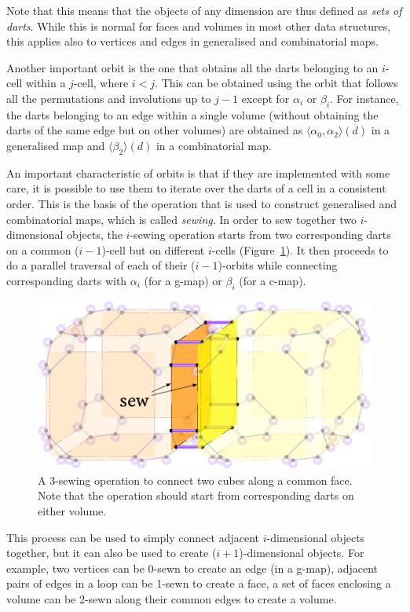 Note that this means that the objects of any dimension are thus defined as \emph{sets of darts}.
While this is normal for faces and volumes in most other data structures, this applies also to vertices and edges in generalised and combinatorial maps.

Another important orbit is the one that obtains all the darts belonging to an \(i\)-cell within a \(j\)-cell, where \(i < j\).
This can be obtained using the orbit that follows all the permutations and involutions up to \(j-1\) except for \(\alpha_i\) or \(\beta_i\).
For instance, the darts belonging to an edge within a single volume (without obtaining the darts of the same edge but on other volumes) are obtained as \(\langle \alpha_0, \alpha_2 \rangle(d)\) in a generalised map and \(\langle \beta_2 \rangle(d)\) in a combinatorial map.

An important characteristic of orbits is that if they are implemented with some care, it is possible to use them to iterate over the darts of a cell in a consistent order.
This is the basis of the operation that is used to construct generalised and combinatorial maps, which is called \emph{sewing}.
In order to sew together two \(i\)-dimensional objects, the \(i\)-sewing operation starts from two corresponding darts on a common (\(i-1\))-cell but on different \(i\)-cells (Figure~\ref{fig:3-sew}).
It then proceeds to do a parallel traversal of each of their (\(i-1\))-orbits while connecting corresponding darts with \(\alpha_i\) (for a g-map) or \(\beta_i\) (for a c-map).

\begin{figure}
\centering
\includegraphics[width=0.8\linewidth]{figs/3-sew}
\caption{A 3-sewing operation to connect two cubes along a common face.
Note that the operation should start from corresponding darts on either volume.}%
\label{fig:3-sew}
\end{figure}

This process can be used to simply connect adjacent \(i\)-dimensional objects together, but it can also be used to create (\(i+1\))-dimensional objects.
For example, two vertices can be 0-sewn to create an edge (in a g-map), adjacent pairs of edges in a loop can be 1-sewn to create a face, a set of faces enclosing a volume can be 2-sewn along their common edges to create a volume.

